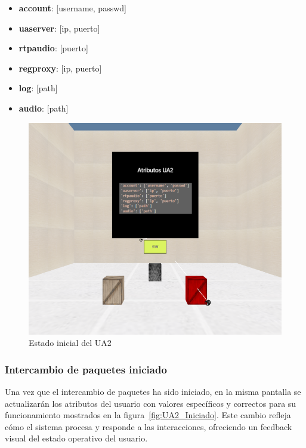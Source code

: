 \documentclass[a4paper, 12pt]{book}
\begin{document}
\begin{itemize}
  \item \textbf{account}: [username, passwd]
  \item \textbf{uaserver}: [ip, puerto]
  \item \textbf{rtpaudio}: [puerto]
  \item \textbf{regproxy}: [ip, puerto]
  \item \textbf{log}: [path]
  \item \textbf{audio}: [path]
\end{itemize}

\begin{figure}
  \centering
  \includegraphics[width=12cm, keepaspectratio]{img/resultados/UA2_NoIniciado.png}
  \caption{Estado inicial del UA2}
  \label{fig:UA2_NoIniciado}
\end{figure}


\subsubsection{Intercambio de paquetes iniciado}
\label{subsubsec:Intercambio_Iniciado}
Una vez que el intercambio de paquetes ha sido iniciado, en la misma pantalla se 
actualizarán los atributos del usuario con valores específicos y correctos para su funcionamiento mostrados en la figura~\ref{fig:UA2_Iniciado}.  
Este cambio refleja cómo el sistema procesa y responde a las interacciones, ofreciendo un feedback visual del estado operativo del usuario.
\end{document}
